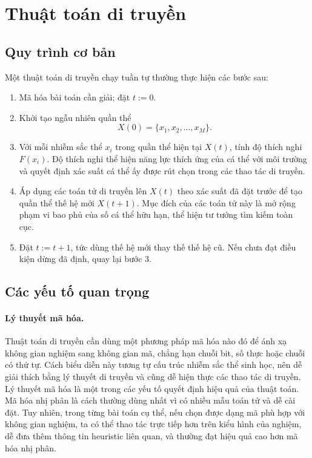 \documentclass[11pt]{article}
\begin{document}
\section{Thuật toán di truyền}

\subsection{Quy trình cơ bản}

Một thuật toán di truyền chạy tuần tự thường thực hiện các bước sau:
\begin{enumerate}
  \item Mã hóa bài toán cần giải; đặt \(t:=0\).
  \item Khởi tạo ngẫu nhiên quần thể
  \[
    X(0)=\{x_1,x_2,\ldots,x_M\}.
  \]
  \item Với mỗi nhiễm sắc thể \(x_i\) trong quần thể hiện tại \(X(t)\), tính
  độ thích nghi \(F(x_i)\). Độ thích nghi thể hiện năng lực thích ứng của cá
  thể với môi trường và quyết định xác suất cá thể ấy được rút chọn trong các
  thao tác di truyền.
  \item Áp dụng các toán tử di truyền lên \(X(t)\) theo xác suất đã đặt trước
  để tạo quần thể thế hệ mới \(X(t+1)\). Mục đích của các toán tử này là mở
  rộng phạm vi bao phủ của số cá thể hữu hạn, thể hiện tư tưởng tìm kiếm toàn
  cục.
  \item Đặt \(t:=t+1\), tức dùng thế hệ mới thay thế thế hệ cũ. Nếu chưa đạt
  điều kiện dừng đã định, quay lại bước 3.
\end{enumerate}

\subsection{Các yếu tố quan trọng}

\paragraph{Lý thuyết mã hóa.}
Thuật toán di truyền cần dùng một phương pháp mã hóa nào đó để ánh xạ không
gian nghiệm sang không gian mã, chẳng hạn chuỗi bit, số thực hoặc chuỗi có thứ
tự. Cách biểu diễn này tương tự cấu trúc nhiễm sắc thể sinh học, nên dễ giải
thích bằng lý thuyết di truyền và cũng dễ hiện thực các thao tác di truyền.
Lý thuyết mã hóa là một trong các yếu tố quyết định hiệu quả của thuật toán.
Mã hóa nhị phân là cách thường dùng nhất vì có nhiều mẫu toán tử và dễ cài
đặt. Tuy nhiên, trong từng bài toán cụ thể, nếu chọn được dạng mã phù hợp với
không gian nghiệm, ta có thể thao tác trực tiếp hơn trên kiểu hình của nghiệm,
dễ đưa thêm thông tin heuristic liên quan, và thường đạt hiệu quả cao hơn mã
hóa nhị phân.
\end{document}
